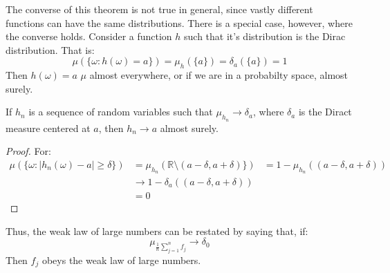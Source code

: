             The converse of this theorem is not true in general,
            since vastly different functions can have the same
            distributions. There is a special case, however, where the
            converse holds. Consider a function $h$ such that it's
            distribution is the Dirac distribution. That is:
            \begin{equation}
                \mu(\{\omega:h(\omega)=a\})=
                \mu_{h}(\{a\})=\delta_{a}(\{a\})=1
            \end{equation}
            Then $h(\omega)=a$ $\mu$ almost everywhere, or if we are
            in a probabilty space, almost surely.
            \begin{theorem}
                If $h_{n}$ is a sequence of random variables such that
                $\mu_{h_{n}}\rightarrow\delta_{a}$, where $\delta_{a}$
                is the Diract measure centered at $a$, then
                $h_{n}\rightarrow{a}$ almost surely.
            \end{theorem}
            \begin{proof}
                For:
                \begin{align}
                    \mu(\{\omega:|h_{n}(\omega)-a|\geq\delta\})
                    &=\mu_{h_{n}}
                        (\mathbb{R}\setminus(a-\delta,a+\delta)\})
                    &=1-\mu_{h_{n}}((a-\delta,a+\delta))\\
                    &\rightarrow{1}-\delta_{a}((a-\delta,a+\delta))\\
                    &=0
                \end{align}
            \end{proof}
            Thus, the weak law of large numbers can be restated by
            saying that, if:
            \begin{equation}
                \mu_{\frac{1}{n}\sum_{j=1}^{n}f_{j}}\rightarrow
                \delta_{0}
            \end{equation}
            Then $f_{j}$ obeys the weak law of large numbers.
